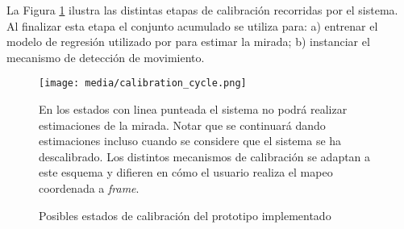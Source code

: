   La Figura \ref{fig:calibration_cycle} ilustra las distintas etapas de
  calibración recorridas por el sistema.
  Al finalizar esta etapa el conjunto acumulado se utiliza para: a) entrenar el
  modelo de regresión utilizado por \webgazer para estimar la mirada; b)
  instanciar el mecanismo de detección de movimiento.

  \begin{figure}
      \centering
      \texttt{[image: media/calibration\_cycle.png]}
      \caption{Posibles estados de calibración del prototipo implementado}
      En los estados con linea punteada el sistema no podrá realizar estimaciones
      de la mirada.
      Notar que se continuará dando estimaciones incluso cuando se considere que
      el sistema se ha descalibrado.
      Los distintos mecanismos de calibración se adaptan a este esquema y
      difieren en cómo el usuario realiza el mapeo coordenada a \textit{frame}.
      \label{fig:calibration_cycle}
  \end{figure}



